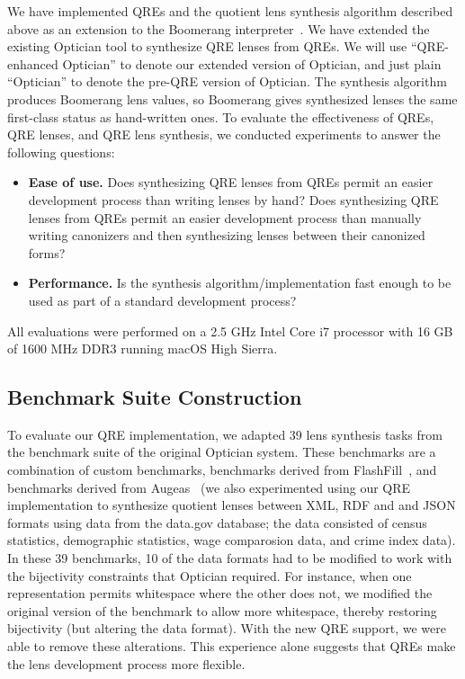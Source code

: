 \documentclass[acmsmall,screen]{acmart}
\newcommand{\QOpt}{QRE-enhanced Optician}
\begin{document}
We have implemented QREs and the quotient lens synthesis algorithm described
above as an extension to the Boomerang
interpreter~\cite{boomerang,quotientlenses}. We have extended the existing
Optician tool to synthesize QRE lenses from QREs. We will use 
``\QOpt'' to denote our extended version of Optician, and just plain ``Optician'' to denote
the pre-QRE version of Optician. The synthesis algorithm produces Boomerang lens
values, so Boomerang gives synthesized lenses the same first-class status as hand-written ones. To
evaluate the effectiveness of QREs, QRE lenses, and QRE lens synthesis, we
conducted experiments to answer the following questions:
%
\begin{itemize}
  \item {\bf Ease of use.} Does synthesizing QRE lenses from QREs permit an
  easier development process than writing lenses by hand?
  Does synthesizing QRE lenses from QREs permit an easier development
  process than manually writing canonizers and then synthesizing lenses between
  their canonized forms?  
  \item {\bf Performance.} Is the synthesis algorithm/implementation fast enough to be
  used as part of a standard development process?
\end{itemize}
%
All evaluations were performed on a 2.5 GHz Intel Core i7 processor with 16 GB
of 1600 MHz DDR3 running macOS High Sierra.


\subsection{Benchmark Suite Construction}

To evaluate our QRE implementation, we adapted 39 lens synthesis tasks
from the benchmark suite of the original Optician system. These
benchmarks are a combination of custom benchmarks, benchmarks derived
from FlashFill~\cite{flashfill}, and benchmarks derived from
Augeas~\cite{augeas2} (we also experimented using our QRE implementation to synthesize quotient lenses between XML, RDF and and JSON formats using data from the data.gov database; the data consisted of census statistics, demographic statistics, wage comparosion data, and crime index data).  In these 39 benchmarks, 10 of
the data formats had to be modified to work with the bijectivity
constraints that Optician required. For instance, when one
representation permits whitespace where the other does not, we
modified the original version of the benchmark to allow more whitespace,
thereby restoring bijectivity (but altering the data format). With the
new QRE support, we were able to remove these alterations.  This
experience alone suggests that QREs make the lens development process
more flexible.
\end{document}
